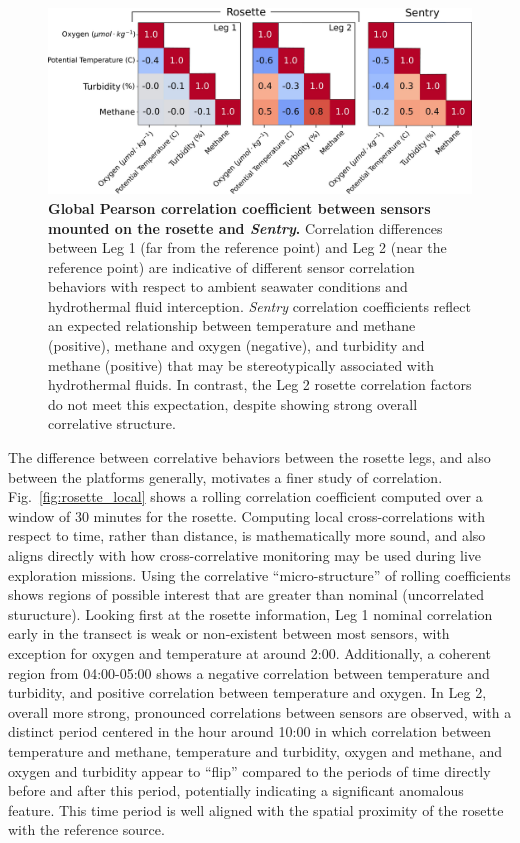 \begin{figure}[h!]
    \centering
    \includegraphics[width=0.9\columnwidth]{figures/chap3_all_global_corr.jpg}
    \caption[Global pearson correlation coefficients]{\textbf{Global Pearson correlation coefficient between sensors mounted on the rosette and \emph{Sentry}.} Correlation differences between Leg 1 (far from the reference point) and Leg 2 (near the reference point) are indicative of different sensor correlation behaviors with respect to ambient seawater conditions and hydrothermal fluid interception. \emph{Sentry} correlation coefficients reflect an expected relationship between temperature and methane (positive), methane and oxygen (negative), and turbidity and methane (positive) that may be stereotypically associated with hydrothermal fluids. In contrast, the Leg 2 rosette correlation factors do not meet this expectation, despite showing strong overall correlative structure.}
    \label{fig:global_corr}
\end{figure}

The difference between correlative behaviors between the rosette legs, and also between the platforms generally, motivates a finer study of correlation. Fig.~\ref{fig:rosette_local} shows a rolling correlation coefficient computed over a window of 30 minutes for the rosette. Computing local cross-correlations with respect to time, rather than distance, is mathematically more sound, and also aligns directly with how cross-correlative monitoring may be used during live exploration missions. Using the correlative ``micro-structure'' of rolling coefficients shows regions of possible interest that are greater than nominal (uncorrelated sturucture). Looking first at the rosette information, Leg 1 nominal correlation early in the transect is weak or non-existent between most sensors, with exception for oxygen and temperature at around 2:00. Additionally, a coherent region from 04:00-05:00 shows a negative correlation between temperature and turbidity, and positive correlation between temperature and oxygen. In Leg 2, overall more strong, pronounced correlations between sensors are observed, with a distinct period centered in the hour around 10:00 in which correlation between temperature and methane, temperature and turbidity, oxygen and methane, and oxygen and turbidity appear to ``flip'' compared to the periods of time directly before and after this period, potentially indicating a significant anomalous feature. This time period is well aligned with the spatial proximity of the rosette with the reference source.


